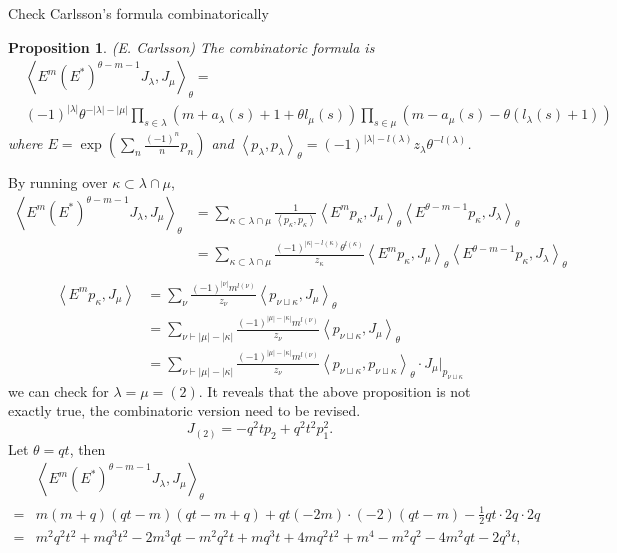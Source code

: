 \documentclass{article}
\newtheorem{prop}{Proposition}[theorem]
\newcommand{\inprod}[1]{\left<{#1}\right>}
\begin{document}
\begin{subsection}{Check Carlsson's formula combinatorically}
\begin{prop}{(E. Carlsson)} The combinatoric formula is
\[
\begin{aligned}
&\inprod{E^m(E^*)^{\theta-m-1}J_\lambda,J_\mu}_\theta = \\
&(-1)^{|\lambda|}\theta^{-|\lambda|-|\mu|}\prod_{s\in\lambda}(m+a_\lambda(s)+1+\theta l_\mu(s))\prod_{s\in\mu}(m-a_\mu(s)-\theta(l_\lambda(s)+1))
\end{aligned}
\]where $E=\exp\left(\sum_n\frac{(-1)^n}{n}p_n\right)$ and $\inprod{p_\lambda,p_\lambda}_\theta = (-1)^{|\lambda|-l(\lambda)}z_\lambda\theta^{-l(\lambda)}$.
\end{prop}
By running over $\kappa\subset\lambda\cap\mu$,
\[
\begin{aligned}
\inprod{E^m(E^*)^{\theta-m-1}J_\lambda,J_\mu}_\theta &= \sum_{\kappa\subset\lambda\cap\mu}\frac{1}{\inprod{p_\kappa,p_\kappa}}\inprod{E^mp_\kappa, J_\mu}_\theta\inprod{E^{\theta-m-1}p_\kappa,J_\lambda}_\theta\\
&= \sum_{\kappa\subset\lambda\cap\mu}\frac{(-1)^{|\kappa|-l(\kappa)}\theta^{l(\kappa)}}{z_\kappa}\inprod{E^mp_\kappa, J_\mu}_\theta\inprod{E^{\theta-m-1}p_\kappa,J_\lambda}_\theta\\
\end{aligned}
\]
\[
\begin{aligned}
\inprod{E^mp_\kappa, J_\mu} &= \sum_{\nu}\frac{(-1)^{|\nu|}m^{l(\nu)}}{z_\nu}\inprod{p_{\nu\sqcup\kappa},J_\mu}_\theta\\
&= \sum_{\nu\vdash|\mu|-|\kappa|}\frac{(-1)^{|\mu|-|\kappa|}m^{l(\nu)}}{z_\nu}\inprod{p_{\nu\sqcup\kappa},J_\mu}_\theta\\
&= \sum_{\nu\vdash|\mu|-|\kappa|}\frac{(-1)^{|\mu|-|\kappa|}m^{l(\nu)}}{z_\nu}\inprod{p_{\nu\sqcup\kappa},p_{\nu\sqcup\kappa}}_\theta\cdot J_\mu|_{p_{\nu\sqcup\kappa}}
\end{aligned}
\]
we can check for $\lambda = \mu = (2)$. It reveals that the above proposition is not exactly true, the combinatoric version need to be revised.
\[J_{(2)} = -q^2tp_2 + q^2t^2p_1^2.\]Let $\theta = qt$, then 
\[\begin{aligned}
&\inprod{E^m(E^*)^{\theta-m-1}J_\lambda,J_\mu}_\theta\\
=&m(m+q)(qt - m) (qt - m + q) + qt(-2m) \cdot(-2) (qt - m) - \frac12 qt \cdot2q\cdot 2q\\
=& m^2q^2t^2 + mq^3t^2 - 2m^3qt - m^2q^2t + mq^3t + 4mq^2t^2 + m^4 - m^2q^2 - 4m^2qt - 2q^3t,
\end{aligned}\]

\end{subsection}
\end{document}

